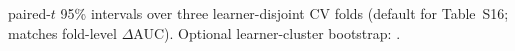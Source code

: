 paired-$t$ 95\% intervals over three learner-disjoint CV folds (default for Table~S16; matches fold-level $\Delta$AUC). Optional learner-cluster bootstrap: .